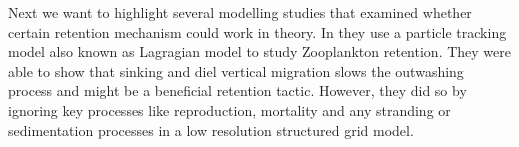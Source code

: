 \documentclass[npg, manuscript]{copernicus}
\begin{document}
Next we want to highlight several modelling studies that examined whether certain retention mechanism could work in theory.
In \citep{Simons2006,Kimmerer2014} they use a particle tracking model also known as Lagragian model to study Zooplankton retention.
They were able to show that sinking and diel vertical migration slows the outwashing process and might be a beneficial retention tactic.
However, they did so by ignoring key processes like reproduction, mortality and any stranding or sedimentation processes in a low resolution structured grid model.
\end{document}
